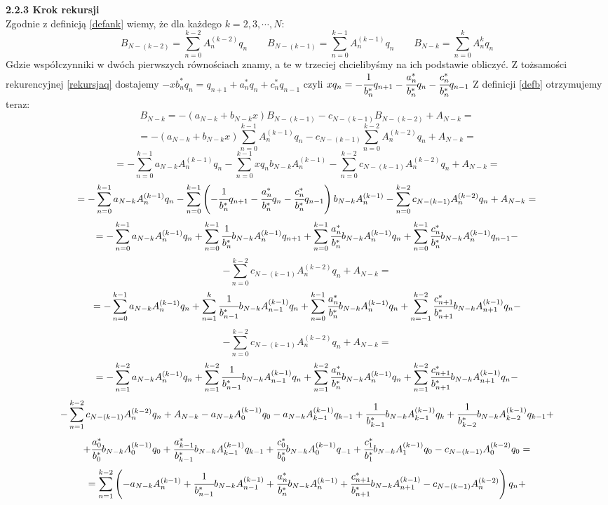 \documentclass[a4paper]{article}
\begin{document}
\large
\textbf{2.2.3 Krok rekursji}\\
\normalsize
Zgodnie z definicją \eqref{defank} wiemy, że dla każdego $k = 2,3,\cdots,N$:
$$B_{N-(k-2)} = \sum_{n=0}^{k-2} A_n^{(k-2)}q_n \quad \quad B_{N-(k-1)} = \sum_{n=0}^{k-1} A_n^{(k-1)}q_n \quad \quad B_{N-k} = \sum_{n=0}^{k} A_n^{k}q_n$$
Gdzie współczynniki w dwóch pierwszych równościach znamy, a te w trzeciej chcielibyśmy na ich podstawie obliczyć. Z tożsamości rekurencyjnej \eqref{rekursjaq} dostajemy $-xb_n^*q_n = q_{n+1} + a_n^*q_n + c_n^*q_{n-1}$ czyli $xq_n = -\cfrac{1}{b_n^*} q_{n+1} - \cfrac{a_n^*}{b_n^*} q_n - \cfrac{c_n^*}{b_n^*} q_{n-1}$ Z definicji \eqref{defb} otrzymujemy teraz:
$$B_{N-k} = -(a_{N-k} + b_{N-k}x)B_{N-(k-1)} - c_{N-(k-1)} B_{N-(k-2)} + A_{N-k} =$$
$$ = -(a_{N-k} + b_{N-k}x)\sum_{n=0}^{k-1} A_n^{(k-1)}q_n - c_{N-(k-1)} \sum_{n=0}^{k-2} A_n^{(k-2)}q_n + A_{N-k} = $$
$$ = -\sum_{n=0}^{k-1}a_{N-k}A_n^{(k-1)}q_n - \sum_{n=0}^{k-1} xq_nb_{N-k}A_n^{(k-1)} - \sum_{n=0}^{k-2} c_{N-(k-1)}A_n^{(k-2)}q_n + A_{N-k} = $$
$$ = -\sum_{n=0}^{k-1}a_{N-k}A_n^{(k-1)}q_n - \sum_{n=0}^{k-1} \left(-\cfrac{1}{b_n^*} q_{n+1} - \cfrac{a_n^*}{b_n^*} q_n - \cfrac{c_n^*}{b_n^*} q_{n-1}\right)b_{N-k}A_n^{(k-1)} - \sum_{n=0}^{k-2} c_{N-(k-1)}A_n^{(k-2)}q_n + A_{N-k} =$$
$$ =-\sum_{n=0}^{k-1}a_{N-k}A_n^{(k-1)}q_n + \sum_{n=0}^{k-1} \cfrac{1}{b_n^*}b_{N-k}A_n^{(k-1)}q_{n+1} + \sum_{n=0}^{k-1} \cfrac{a_n^*}{b_n^*}b_{N-k}A_n^{(k-1)}q_n + \sum_{n=0}^{k-1} \cfrac{c_n^*}{b_n^*}b_{N-k}A_n^{(k-1)}q_{n-1} -$$
$$- \sum_{n=0}^{k-2} c_{N-(k-1)}A_n^{(k-2)}q_n + A_{N-k} =$$
$$ = -\sum_{n=0}^{k-1}a_{N-k}A_n^{(k-1)}q_n + \sum_{n=1}^{k} \cfrac{1}{b_{n-1}^*}b_{N-k}A_{n-1}^{(k-1)}q_n + \sum_{n=0}^{k-1} \cfrac{a_n^*}{b_n^*}b_{N-k}A_n^{(k-1)}q_n + \sum_{n=-1}^{k-2} \cfrac{c_{n+1}^*}{b_{n+1}^*}b_{N-k}A_{n+1}^{(k-1)}q_n -$$
$$- \sum_{n=0}^{k-2} c_{N-(k-1)}A_n^{(k-2)}q_n + A_{N-k} =$$
$$ = -\sum_{n=1}^{k-2}a_{N-k}A_n^{(k-1)}q_n + \sum_{n=1}^{k-2} \cfrac{1}{b_{n-1}^*}b_{N-k}A_{n-1}^{(k-1)}q_n + \sum_{n=1}^{k-2} \cfrac{a_n^*}{b_n^*}b_{N-k}A_n^{(k-1)}q_n + \sum_{n=1}^{k-2} \cfrac{c_{n+1}^*}{b_{n+1}^*}b_{N-k}A_{n+1}^{(k-1)}q_n -$$
$$ -  \sum_{n=1}^{k-2} c_{N-(k-1)}A_n^{(k-2)}q_n + A_{N-k} -a_{N-k}A_0^{(k-1)}q_0 - a_{N-k}A_{k-1}^{(k-1)}q_{k-1} + \cfrac{1}{b_{k-1}^*}b_{N-k}A_{k-1}^{(k-1)}q_k + \cfrac{1}{b_{k-2}^*}b_{N-k}A_{k-2}^{(k-1)}q_{k-1} +$$
$$ + \cfrac{a_0^*}{b_0^*}b_{N-k}A_0^{(k-1)}q_0 + \cfrac{a_{k-1}^*}{b_{k-1}^*}b_{N-k}A_{k-1}^{(k-1)}q_{k-1} + \cfrac{c_0^*}{b_0^*}b_{N-k}A_0^{(k-1)}q_{-1} + \cfrac{c_1^*}{b_1^*}b_{N-k}A_1^{(k-1)}q_0 - c_{N-(k-1)}A_0^{(k-2)}q_0=$$
$$ = \sum_{n=1}^{k-2}\left(-a_{N-k}A_n^{(k-1)} + \cfrac{1}{b_{n-1}^*}b_{N-k}A_{n-1}^{(k-1)} + \cfrac{a_n^*}{b_n^*}b_{N-k}A_n^{(k-1)} + \cfrac{c_{n+1}^*}{b_{n+1}^*}b_{N-k}A_{n+1}^{(k-1)} - c_{N-(k-1)}A_n^{(k-2)}\right)q_n +$$
\end{document}

